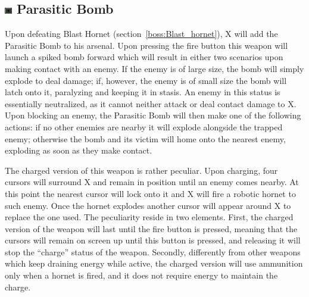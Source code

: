 \subsection{\includegraphics[width=12px, height=10px]{figures/X3/weapons/P_bomb.jpg} Parasitic Bomb}\label{Parasitic_Bomb}

Upon defeating Blast Hornet (section~\ref{boss:Blast_hornet}), X will add the Parasitic Bomb to his arsenal. Upon pressing the fire button this weapon will launch a spiked bomb forward which will result in either two scenarios upon making contact with an enemy. If the enemy is of large size, the bomb will simply explode to deal damage; if, however, the enemy is of small size the bomb will latch onto it, paralyzing and keeping it in stasis. An enemy in this status is essentially neutralized, as it cannot neither attack or deal contact damage to X. Upon blocking an enemy, the Parasitic Bomb will then make one of the following actions: if no other enemies are nearby it will explode alongside the trapped enemy; otherwise the bomb and its victim will home onto the nearest enemy, exploding as soon as they make contact. 

The charged version of this weapon is rather peculiar. Upon charging, four cursors will surround X and remain in position until an enemy comes nearby. At this point the nearest cursor will lock onto it and X will fire a robotic hornet to such enemy. Once the hornet explodes another cursor will appear around X to replace the one used. The peculiarity reside in two elements. First, the charged version of the weapon will last until the fire button is pressed, meaning that the cursors will remain on screen up until this button is pressed, and releasing it will stop the ``charge'' status of the weapon. Secondly, differently from other weapons which keep draining energy while active, the charged version will use ammunition only when a hornet is fired, and it does not require energy to maintain the charge.

